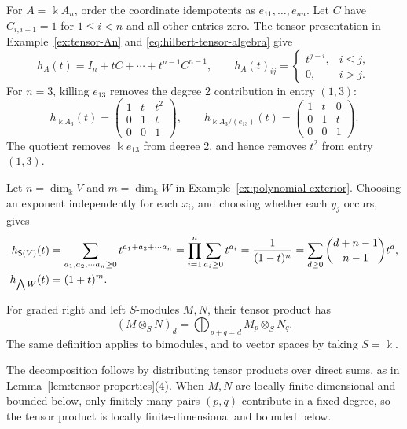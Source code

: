 \begin{example}\label{ex:hilbert-triangular}
For $A=\Bbbk A_n$, order the coordinate idempotents as $e_{11},\ldots,e_{nn}$.
Let $C$ have $C_{i,i+1}=1$ for $1\leq i<n$ and all other entries zero.
The tensor presentation in Example~\ref{ex:tensor-An} and \eqref{eq:hilbert-tensor-algebra} give
\[
h_A(t)=I_n+tC+\cdots+t^{n-1}C^{n-1},
\qquad h_A(t)_{ij}=\begin{cases}t^{j-i},&i\leq j,\\0,&i>j.\end{cases}
\]
For $n=3$, killing $e_{13}$ removes the degree $2$ contribution in entry $(1,3)$:
\[
h_{\Bbbk A_3}(t)=\begin{pmatrix}1&t&t^2\\0&1&t\\0&0&1\end{pmatrix},
\qquad
h_{\Bbbk A_3/(e_{13})}(t)=\begin{pmatrix}1&t&0\\0&1&t\\0&0&1\end{pmatrix}.
\]
The quotient removes $\Bbbk e_{13}$ from degree $2$, and hence removes $t^2$ from entry $(1,3)$.
\end{example}

\begin{example}\label{ex:hilbert-polynomial-exterior}
Let $n=\dim_\Bbbk V$ and $m=\dim_\Bbbk W$ in Example~\ref{ex:polynomial-exterior}.
Choosing an exponent independently for each $x_i$, and choosing whether each $y_j$ occurs, gives
\begin{align*}
h_{\mathsf{S}(V)}(t)&=\sum_{a_1,a_2,\cdots a_n\ge 0} t^{a_1+a_2+\cdots a_n}  =\prod_{i=1}^n\sum_{a_i\geq0}t^{a_i}=\frac{1}{(1-t)^n}=\sum_{d\ge 0}\binom{d+n-1}{n-1}t^d,\\
h_{\bigwedge W}(t)&=(1+t)^m.
\end{align*}
\end{example}


\begin{definition}\label{def:total-tensor-grading}
For graded right and left $S$-modules $M,N$, their tensor product has 
\[
(M\otimes_S N)_d=\bigoplus_{p+q=d}M_p\otimes_S N_q.
\]
The same definition applies to bimodules, and to vector spaces by taking $S=\Bbbk$.
\end{definition}

The decomposition follows by distributing tensor products over direct sums, as in Lemma~\ref{lem:tensor-properties}(4).
When $M,N$ are locally finite-dimensional and bounded below, only finitely many pairs $(p,q)$ contribute in a fixed degree, so the tensor product is locally finite-dimensional and bounded below.

